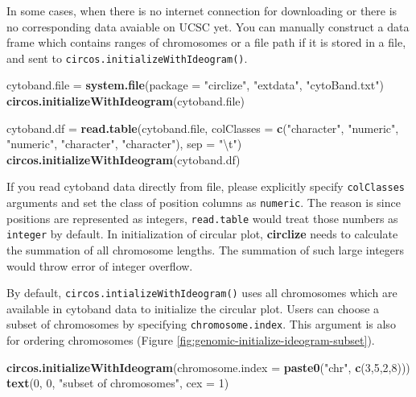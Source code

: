 \documentclass[]{book}
\newenvironment{Shaded}{\begin{snugshade}}{\end{snugshade}}
\newcommand{\KeywordTok}[1]{\textcolor[rgb]{0.13,0.29,0.53}{\textbf{#1}}}
\newcommand{\DataTypeTok}[1]{\textcolor[rgb]{0.13,0.29,0.53}{#1}}
\newcommand{\DecValTok}[1]{\textcolor[rgb]{0.00,0.00,0.81}{#1}}
\newcommand{\CharTok}[1]{\textcolor[rgb]{0.31,0.60,0.02}{#1}}
\newcommand{\StringTok}[1]{\textcolor[rgb]{0.31,0.60,0.02}{#1}}
\newcommand{\NormalTok}[1]{#1}
\begin{document}
In some cases, when there is no internet connection for downloading or
there is no corresponding data avaiable on UCSC yet. You can manually
construct a data frame which contains ranges of chromosomes or a file
path if it is stored in a file, and sent to
\texttt{circos.initializeWithIdeogram()}.

\begin{Shaded}
\begin{Highlighting}[]
\NormalTok{cytoband.file =}\StringTok{ }\KeywordTok{system.file}\NormalTok{(}\DataTypeTok{package =} \StringTok{"circlize"}\NormalTok{, }\StringTok{"extdata"}\NormalTok{, }\StringTok{"cytoBand.txt"}\NormalTok{)}
\KeywordTok{circos.initializeWithIdeogram}\NormalTok{(cytoband.file)}

\NormalTok{cytoband.df =}\StringTok{ }\KeywordTok{read.table}\NormalTok{(cytoband.file, }\DataTypeTok{colClasses =} \KeywordTok{c}\NormalTok{(}\StringTok{"character"}\NormalTok{, }\StringTok{"numeric"}\NormalTok{,}
    \StringTok{"numeric"}\NormalTok{, }\StringTok{"character"}\NormalTok{, }\StringTok{"character"}\NormalTok{), }\DataTypeTok{sep =} \StringTok{"}\CharTok{\textbackslash{}t}\StringTok{"}\NormalTok{)}
\KeywordTok{circos.initializeWithIdeogram}\NormalTok{(cytoband.df)}
\end{Highlighting}
\end{Shaded}

If you read cytoband data directly from file, please explicitly specify
\texttt{colClasses} arguments and set the class of position columns as
\texttt{numeric}. The reason is since positions are represented as
integers, \texttt{read.table} would treat those numbers as
\texttt{integer} by default. In initialization of circular plot,
\textbf{circlize} needs to calculate the summation of all chromosome
lengths. The summation of such large integers would throw error of
integer overflow.

By default, \texttt{circos.intializeWithIdeogram()} uses all chromosomes
which are available in cytoband data to initialize the circular plot.
Users can choose a subset of chromosomes by specifying
\texttt{chromosome.index}. This argument is also for ordering
chromosomes (Figure \ref{fig:genomic-initialize-ideogram-subset}).

\begin{Shaded}
\begin{Highlighting}[]
\KeywordTok{circos.initializeWithIdeogram}\NormalTok{(}\DataTypeTok{chromosome.index =} \KeywordTok{paste0}\NormalTok{(}\StringTok{"chr"}\NormalTok{, }\KeywordTok{c}\NormalTok{(}\DecValTok{3}\NormalTok{,}\DecValTok{5}\NormalTok{,}\DecValTok{2}\NormalTok{,}\DecValTok{8}\NormalTok{)))}
\KeywordTok{text}\NormalTok{(}\DecValTok{0}\NormalTok{, }\DecValTok{0}\NormalTok{, }\StringTok{"subset of chromosomes"}\NormalTok{, }\DataTypeTok{cex =} \DecValTok{1}\NormalTok{)}
\end{Highlighting}
\end{Shaded}
\end{document}
